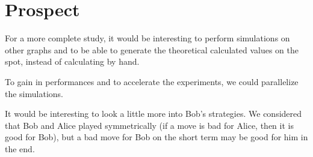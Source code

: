 \section{Prospect}
For a more complete study, it would be interesting to perform simulations on other graphs and to be able to generate the theoretical calculated values on the spot, instead of calculating by hand.


To gain in performances and to accelerate the experiments, we could parallelize the simulations.


It would be interesting to look a little more into Bob's strategies. We considered that Bob and Alice played symmetrically (if a move is bad for Alice, then it is good for Bob), but a bad move for Bob on the short term may be good for him in the end.
